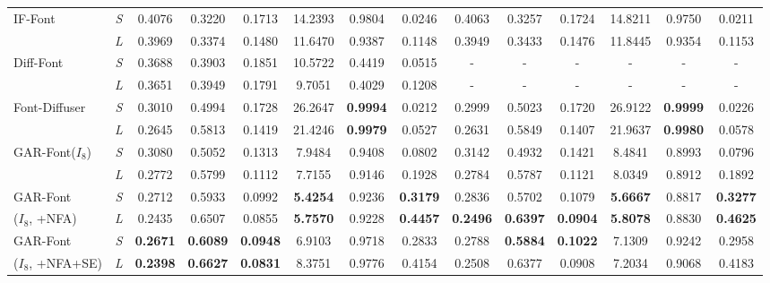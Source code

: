 \begin{table}[t!]
{\begin{tabular}{l | c | c c c c c c | c c c c c c }
\hline
IF-Font & \textit{S} & 0.4076 & 0.3220 & 0.1713 & 14.2393 & 0.9804 & 0.0246 & 0.4063 & 0.3257 & 0.1724 & 14.8211 & 0.9750 & 0.0211 \\
         & \textit{L} & 0.3969 & 0.3374 & 0.1480 & 11.6470 & 0.9387 & 0.1148 & 0.3949 & 0.3433 & 0.1476 & 11.8445 & 0.9354 & 0.1153 \\
\hline
Diff-Font & \textit{S} & 0.3688 & 0.3903 & 0.1851 & 10.5722 & 0.4419 & 0.0515 & - & - & - & - & - & - \\
           & \textit{L} & 0.3651 & 0.3949 & 0.1791 & 9.7051 & 0.4029 & 0.1208 & - & - & - & - & - & - \\
\hline
Font-Diffuser & \textit{S} & 0.3010 & 0.4994 & 0.1728 & 26.2647 & \cellcolor{blue!20}\textbf{0.9994} & 0.0212 & 0.2999 & 0.5023 & 0.1720 & 26.9122 & \cellcolor{blue!20}\textbf{0.9999} & 0.0226 \\
               & \textit{L} & 0.2645 & 0.5813 & 0.1419 & 21.4246 & \cellcolor{red!20}\textbf{0.9979} & 0.0527 & 0.2631 & 0.5849 & 0.1407 & 21.9637 & \cellcolor{red!20}\textbf{0.9980} & 0.0578 \\
\Xhline{1.2pt}
GAR-Font($I_{8}$) & \textit{S} & 0.3080 & 0.5052 & 0.1313 & 7.9484 & 0.9408 & 0.0802 & 0.3142 & 0.4932 & 0.1421 & 8.4841 & 0.8993 & 0.0796 \\
 & \textit{L} & 0.2772 & 0.5799 & 0.1112 & 7.7155 & 0.9146 & 0.1928 & 0.2784 & 0.5787 & 0.1121 & 8.0349 & 0.8912 & 0.1892 \\
\hline
GAR-Font & \textit{S} & 0.2712 & 0.5933 & 0.0992 & \cellcolor{blue!20}\textbf{5.4254} & 0.9236 & \cellcolor{blue!20}\textbf{0.3179} & 0.2836 & 0.5702 & 0.1079 & \cellcolor{blue!20}\textbf{5.6667} & 0.8817 & \cellcolor{blue!20}\textbf{0.3277} \\
($I_{8}$, +NFA)  & \textit{L} & 0.2435 & 0.6507 & 0.0855 & \cellcolor{red!20}\textbf{5.7570} & 0.9228 & \cellcolor{red!20}\textbf{0.4457} & \cellcolor{red!20}\textbf{0.2496} & \cellcolor{red!20}\textbf{0.6397} & \cellcolor{red!20}\textbf{0.0904} & \cellcolor{red!20}\textbf{5.8078} & 0.8830 & \cellcolor{red!20}\textbf{0.4625} \\
\hline
GAR-Font & \textit{S} & \cellcolor{blue!20}\textbf{0.2671} & \cellcolor{blue!20}\textbf{0.6089} & \cellcolor{blue!20}\textbf{0.0948} & 6.9103 & 0.9718 & 0.2833 & 0.2788 & \cellcolor{blue!20}\textbf{0.5884} & \cellcolor{blue!20}\textbf{0.1022} & 7.1309 & 0.9242 & 0.2958 \\
($I_{8}$, +NFA+SE)  & \textit{L} & \cellcolor{red!20}\textbf{0.2398} & \cellcolor{red!20}\textbf{0.6627} & \cellcolor{red!20}\textbf{0.0831} & 8.3751 & 0.9776 & 0.4154 & 0.2508 & 0.6377 & 0.0908 & 7.2034 & 0.9068 & 0.4183 \\
\bottomrule
\end{tabular}
}
\label{tab:table1}
\end{table}

